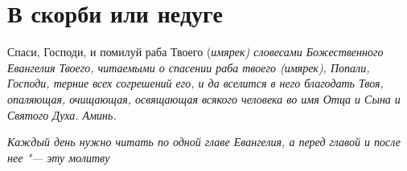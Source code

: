 \section{В скорби или недуге}\begin{mymulticols}
 

Спаси, Господи, и помилуй раба Твоего (\itshape имярек\normalfont{}) словесами Божественного Евангелия Твоего, читаемыми о спасении раба твоего (\itshape имярек\normalfont{}), Попали, Господи, терние всех согрешений его, и да вселится в него благодать Твоя, опаляющая, очищающая, освящающая всякого человека во имя Отца и Сына и Святого Духа. Аминь.

\itshape Каждый день нужно читать по одной главе Евангелия, а перед главой и после нее "--- эту молитву\normalfont{}

 

\end{mymulticols}

\mychapterending


 


